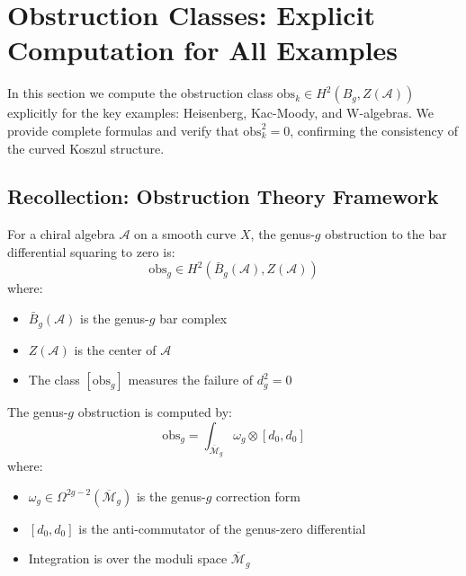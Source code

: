 
\section{Obstruction Classes: Explicit Computation for All Examples}
\label{sec:obstruction-explicit}

In this section we compute the obstruction class $\text{obs}_k \in H^2(B_g, Z(\mathcal{A}))$ 
explicitly for the key examples: Heisenberg, Kac-Moody, and W-algebras. We provide 
complete formulas and verify that $\text{obs}_k^2 = 0$, confirming the consistency 
of the curved Koszul structure.

\subsection{Recollection: Obstruction Theory Framework}
\label{subsec:obstruction-framework-recall}

\begin{definition}\label{def:genus-g-obstruction}
For a chiral algebra $\mathcal{A}$ on a smooth curve $X$, the genus-$g$ 
obstruction to the bar differential squaring to zero is:
$$\text{obs}_g \in H^2(\bar{B}_g(\mathcal{A}), Z(\mathcal{A}))$$
where:
\begin{itemize}
\item $\bar{B}_g(\mathcal{A})$ is the genus-$g$ bar complex
\item $Z(\mathcal{A})$ is the center of $\mathcal{A}$
\item The class $[\text{obs}_g]$ measures the failure of $d_g^2 = 0$
\end{itemize}
\end{definition}

\begin{theorem}\label{thm:obstruction-general}
The genus-$g$ obstruction is computed by:
\begin{equation}
\text{obs}_g = \int_{\overline{\mathcal{M}}_g} \omega_g \otimes [d_0, d_0]
\end{equation}
where:
\begin{itemize}
\item $\omega_g \in \Omega^{2g-2}(\overline{\mathcal{M}}_g)$ is the genus-$g$ 
correction form
\item $[d_0, d_0]$ is the anti-commutator of the genus-zero differential
\item Integration is over the moduli space $\overline{\mathcal{M}}_g$
\end{itemize}
\end{theorem}

